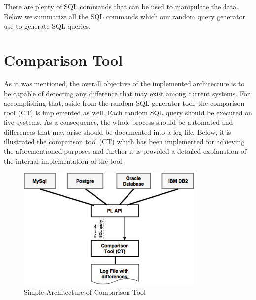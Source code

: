 There are plenty of SQL commands that can be used to manipulate the data. Below we summarize all the SQL commands which our random query generator use to generate SQL queries.   


\section{Comparison Tool} 
As it was mentioned, the overall objective of the implemented architecture is to be capable of detecting  any difference that may exist among current systems. For accomplishing that, aside from the random SQL generator tool,  the comparison tool (CT) is implemented as well. Each random SQL query should be executed on five systems. As a consequence, the whole process should be automated and differences that may arise should be documented into a log file. Below, it is illustrated the comparison tool (CT) which has been implemented for achieving the aforementioned purposes and further it is provided a detailed explanation of the internal implementation of the tool.  


 \begin{figure} 
      \centering
      \includegraphics[width=\textwidth,height=6cm]{Images/2-ComparisonTool}
      \caption{Simple Architecture of Comparison Tool}
      \label{fig:counting-methods}
  \end{figure}

